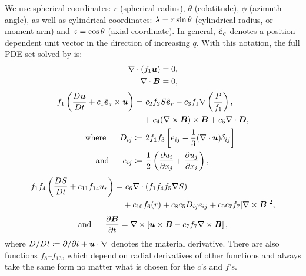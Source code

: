 \documentclass[12pt]{article}
\numberwithin{equation}{section}
\begin{document}
	We use spherical coordinates: $r$ (spherical radius), $\theta$ (colatitude), $\phi$ (azimuth angle), as well as cylindrical coordinates: $\lambda=r\sin\theta$ (cylindrical radius, or moment arm) and $z=\cos\theta$ (axial coordinate). In general, $\hat{\bm{e}}_q$ denotes a position-dependent unit vector in the direction of increasing $q$. With this notation, the full PDE-set solved by {\rayleigh} is:
	\begin{align}
	\nabla\cdot(f_1\bm{u}) &= 0\label{eq:contgen},\\
	\nabla\cdot \bm{B} &= 0,
\end{align}
\begin{subequations}\label{eq:momgen}
	\begin{align}
		f_1\left(\matderiv{\vecu}+c_1\ez\times\vecu\right) =&\ c_2f_2 S\er - c_3 f_1\nabla\left(\frac{P}{f_1} \right), \nonumber\\
		& +c_4(\curl\vecb)\times\vecb+c_5\Div\bm{D},\\
		\where D_{ij} \define&\ 2f_1 f_3 \left[e_{ij} - \frac{1}{3}(\Div\vecu) \delta_{ij} \right]\label{eq:dstressgen}\\
		\andd e_{ij} \define&\ \frac{1}{2}\left(\pderiv{u_i}{x_j} + \pderiv{u_j}{x_i} \right),\label{eq:estressgen}
	\end{align}
\end{subequations}
\begin{align}\label{eq:engen}
	f_1 f_4 \left(\matderiv{S} + c_{11}f_{14} u_r\right) =&\ c_6\Div(f_1 f_4 f_5 \nabla S) \nonumber \\
	&+ c_{10}f_6(r) + c_8 c_5 D_{ij}e_{ij} +c_9c_7f_7|\curl\vecb|^2,
\end{align}
\begin{align}\label{eq:indgen}
	\text{and}\ \ \ \ \  \frac{\partial\bm{B}}{\partial t} = \nabla\times\left[\bm{u}\times\bm{B} - c_7 f_7\nabla\times\bm{B}\right],
\end{align}
where $D/Dt\coloneqq \partial/\partial t+\bm{u}\cdot\nabla$ denotes the material derivative. There are also functions $f_8$--$f_{13}$, which depend on radial derivatives of other functions and always take the same form no matter what is chosen for the $c$'s and $f$'s. 
\end{document}
